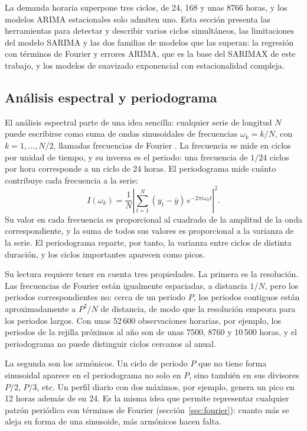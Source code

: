 La demanda horaria superpone tres ciclos, de 24, 168 y unas 8766 horas, y los
modelos ARIMA estacionales solo admiten uno. Esta sección presenta las
herramientas para detectar y describir varios ciclos simultáneos, las
limitaciones del modelo SARIMA y las dos familias de modelos que las
superan: la regresión con términos de Fourier y errores ARIMA, que es la base
del SARIMAX de este trabajo, y los modelos de suavizado exponencial con
estacionalidad compleja.

\subsection{Análisis espectral y periodograma}\label{sec:espectral}

El análisis espectral parte de una idea sencilla: cualquier serie de longitud
$N$ puede escribirse como suma de ondas sinusoidales de frecuencias
$\omega_k = k/N$, con $k = 1, \dots, N/2$, llamadas frecuencias de Fourier
\parencite{shumway2017time}. La frecuencia se mide en ciclos por unidad de
tiempo, y su inversa es el periodo: una frecuencia de $1/24$ ciclos por hora
corresponde a un ciclo de 24 horas. El periodograma mide cuánto contribuye
cada frecuencia a la serie:
\begin{equation}
	I(\omega_k) = \frac{1}{N} \left| \sum_{t=1}^{N} (y_t - \bar{y})\, e^{-2\pi i \omega_k t} \right|^2.
\end{equation}
Su valor en cada frecuencia es proporcional al cuadrado de la amplitud de la
onda correspondiente, y la suma de todos sus valores es proporcional a la
varianza de la serie. El periodograma reparte, por tanto, la varianza entre
ciclos de distinta duración, y los ciclos importantes aparecen como picos.

Su lectura requiere tener en cuenta tres propiedades. La primera es la
resolución. Las frecuencias de Fourier están igualmente espaciadas, a
distancia $1/N$, pero los periodos correspondientes no: cerca de un periodo
$P$, los periodos contiguos están aproximadamente a $P^2/N$ de distancia, de
modo que la resolución empeora para los periodos largos. Con unas 52\,600
observaciones horarias, por ejemplo, los periodos de la rejilla próximos al
año son de unas 7500, 8760 y 10\,500 horas, y el periodograma no puede
distinguir ciclos cercanos al anual.

La segunda son los armónicos. Un ciclo de periodo $P$ que no tiene forma
sinusoidal aparece en el periodograma no solo en $P$, sino también en sus
divisores $P/2$, $P/3$, etc. Un perfil diario con dos máximos, por ejemplo,
genera un pico en 12 horas además de en 24. Es la misma idea que permite
representar cualquier patrón periódico con términos de Fourier
(sección~\ref{sec:fourier}): cuanto más se aleja su forma de una sinusoide,
más armónicos hacen falta.

